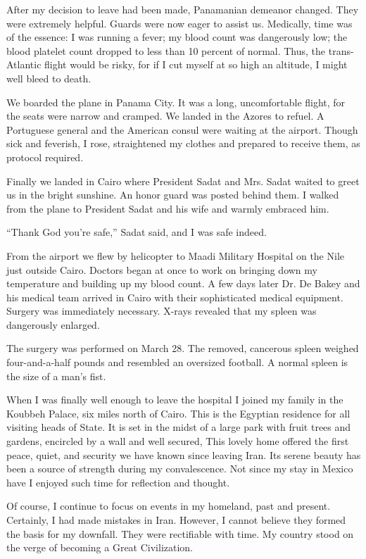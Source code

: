 After my decision to leave had been made, Panamanian demeanor changed. They were extremely helpful. Guards were now eager to assist us. Medically, time was of the essence: I was running a fever; my blood count was dangerously low; the blood platelet count dropped to less than 10 percent of normal. Thus, the trans-Atlantic flight would be risky, for if I cut myself at so high an altitude, I might well bleed to death. 

We boarded the plane in Panama City. It was a long, uncomfortable flight, for the seats were narrow and cramped. We landed in the Azores to refuel. A Portuguese general and the American consul were waiting at the airport. Though sick and feverish, I rose, straightened my clothes and prepared to receive them, as protocol required. 

Finally we landed in Cairo where President Sadat and Mrs. Sadat waited to greet us in the bright sunshine. An honor guard was posted behind them. I walked from the plane to President Sadat and his wife and warmly embraced him. 

“Thank God you're safe,” Sadat said, and I was safe indeed. 

From the airport we flew by helicopter to Maadi Military Hospital on the Nile just outside Cairo. Doctors began at once to work on bringing down my temperature and building up my blood count. A few days later Dr. De Bakey and his medical team arrived in Cairo with their sophisticated medical equipment. Surgery was immediately necessary. X-rays revealed that my spleen was dangerously enlarged. 

The surgery was performed on March 28. The removed, cancerous spleen weighed four-and-a-half pounds and resembled an oversized football. A normal spleen is the size of a man’s fist. 

When I was finally well enough to leave the hospital I joined my family in the Koubbeh Palace, six miles north of Cairo. This is the Egyptian residence for all visiting heads of State. It is set in the midst of a large park with fruit trees and gardens, encircled by a wall and well secured, This lovely home offered the first peace, quiet, and security we have known since leaving Iran. Its serene beauty has been a source of strength during my convalescence. Not since my stay in Mexico have I enjoyed such time for reflection and thought. 

Of course, I continue to focus on events in my homeland, past and present. Certainly, I had made mistakes in Iran. However, I cannot believe they formed the basis for my downfall. They were rectifiable with time. My country stood on the verge of becoming a Great Civilization. 


